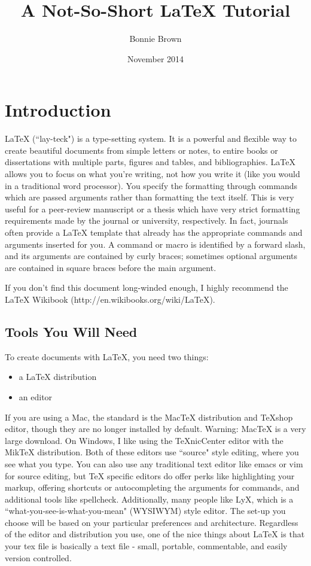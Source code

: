 \documentclass[12pt]{article}
\title{A Not-So-Short LaTeX Tutorial}
\author{Bonnie Brown}
\date{November 2014}
\begin{document}
\maketitle

\section{Introduction}
LaTeX (``lay-teck") is a type-setting system. It is a powerful and flexible way to create beautiful documents from simple letters or notes, to entire books or dissertations with multiple parts, figures and tables, and bibliographies. LaTeX allows you to focus on what you're writing, not how you write it (like you would in a traditional word processor). You specify the formatting through commands which are passed arguments rather than formatting the text itself. This is very useful for a peer-review manuscript or a thesis which have very strict formatting requirements made by the journal or university, respectively. In fact, journals often provide a LaTeX template that already has the appropriate commands and arguments inserted for you. A command or macro is identified by a forward slash, and its arguments are contained by curly braces; sometimes optional arguments are contained in square braces before the main argument.

If you don't find this document long-winded enough, I highly recommend the LaTeX Wikibook (http://en.wikibooks.org/wiki/LaTeX).

\subsection{Tools You Will Need}
To create documents with LaTeX, you need two things:
\begin{itemize}
\item{a LaTeX distribution}
\item{an editor}
\end{itemize}
If you are using a Mac, the standard is the MacTeX distribution and TeXshop editor, though they are no longer installed by default. Warning: MacTeX is a very large download. On Windows, I like using the TeXnicCenter editor with the MikTeX distribution. Both of these editors use ``source" style editing, where you see what you type. You can also use any traditional text editor like emacs or vim for source editing, but TeX specific editors do offer perks like highlighting your markup, offering shortcuts or autocompleting the arguments for commands, and additional tools like spellcheck. Additionally, many people like LyX, which is a ``what-you-see-is-what-you-mean" (WYSIWYM) style editor. The set-up you choose will be based on your particular preferences and architecture. Regardless of the editor and distribution you use, one of the nice things about LaTeX is that your tex file is basically a text file - small, portable, commentable, and easily version controlled.
\end{document}
